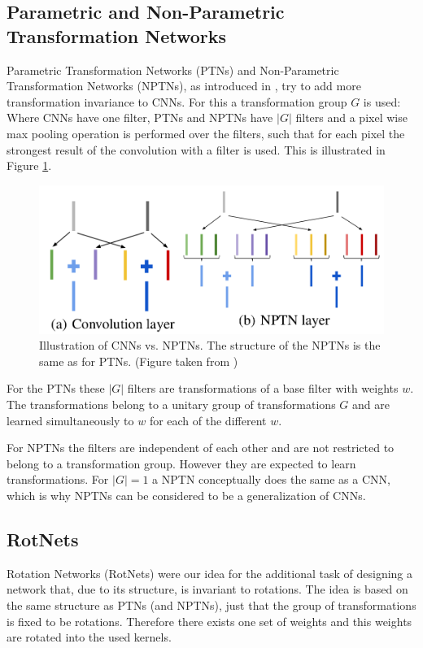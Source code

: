 \documentclass{llncs}
\begin{document}
\subsection{Parametric and Non-Parametric Transformation Networks}

Parametric Transformation Networks (PTNs) and Non-Parametric Transformation Networks (NPTNs), as introduced in \cite{NPTN18}, try to add more transformation invariance to CNNs. For this a transformation group $G$ is used:
Where CNNs have one filter, PTNs and NPTNs have $|G|$ filters and a pixel wise max pooling operation is performed over the filters, such that for each pixel the strongest result of the convolution with a filter is used. This is illustrated in Figure \ref{pic:nptn}.


\begin{figure}
	\begin{center}
	\includegraphics[scale=0.15]{result_images/nptn_paper.png}
	\caption{Illustration of CNNs vs. NPTNs. The structure of the NPTNs is the same as for PTNs. (Figure taken from \cite{NPTN18})}
	\label{pic:nptn}
	\end{center}
\end{figure}
For the PTNs these $|G|$ filters are transformations of a base filter with weights $w$. The transformations belong to a unitary group of transformations $G$ and are learned simultaneously to $w$ for each of the different $w$. 


For NPTNs the filters are independent of each other and are not restricted to belong to a transformation group. However they are expected to learn transformations.
For $|G|=1$ a NPTN conceptually does the same as a CNN, which is why NPTNs can be considered to be a generalization of CNNs. 



\subsection{RotNets}
Rotation Networks (RotNets) were our idea for the additional task of designing a network that, due to its structure, is invariant to rotations. 
The idea is based on the same structure as PTNs (and NPTNs), just that the group of transformations is fixed to be rotations. Therefore there exists one set of weights and this weights are rotated into the used kernels. 
\newcommand{\pytorch}{PyTorch }
\end{document}
